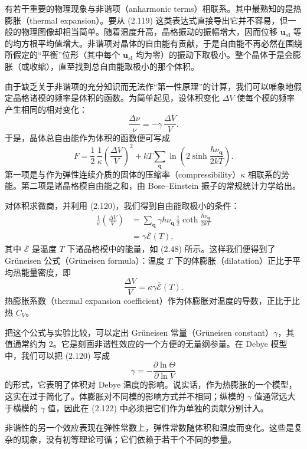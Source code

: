 有若干重要的物理现象与非谐项（anharmonic terms）相联系。其中最熟知的是热膨胀（thermal expansion）。要从 (2.119) 这类表达式直接导出它并不容易，但一般的物理图像却相当简单。随着温度升高，晶格振动的振幅增大，因而位移 $\mathbf{u}_{s\mathbf{l}}$ 等的均方根平均值增大。非谐项对晶体的自由能有贡献，于是自由能不再必然在围绕所假定的“平衡”位形（其中每个 $\mathbf{u}_{s\mathbf{l}}$ 均为零）的振动下取极小。整个晶体于是会膨胀（或收缩），直至找到总自由能取极小的那个体积。

由于缺乏关于非谐项的充分知识而无法作“第一性原理”的计算，我们可以唯象地假定晶格诸模的频率是体积的函数。为简单起见，设体积变化 $\Delta V$ 使每个模的频率产生相同的相对变化：
\begin{equation*}
\frac{\Delta\nu}{\nu}=-\gamma\,\frac{\Delta V}{V}.
\tag{2.120}
\end{equation*}
于是，晶体总自由能作为体积的函数便可写成
\begin{equation*}
F=\frac{1}{2}\,\frac{1}{\kappa}\left(\frac{\Delta V}{V}\right)^{2}+kT\sum_{\mathbf{q}}\ln\left(2\sinh\frac{\hbar\nu_{\mathbf{q}}}{2kT}\right).
\tag{2.121}
\end{equation*}
第一项是与作为弹性连续介质的固体的压缩率（compressibility）$\kappa$ 相联系的势能。第二项是诸晶格模自由能之和，由 Bose–Einstein 振子的常规统计力学给出。

对体积求微商，并利用 (2.120)，我们得到自由能取极小的条件：
\begin{align*}
\frac{1}{\kappa}\left(\frac{\Delta V}{V}\right)&=\sum_{\mathbf{q}}\gamma\hbar\nu_{\mathbf{q}}\,\tfrac{1}{2}\coth\frac{\hbar\nu_{\mathbf{q}}}{2kT}\\
&=\gamma\bar{\mathcal{E}}(T),
\tag{2.122}
\end{align*}
其中 $\bar{\mathcal{E}}$ 是温度 $T$ 下诸晶格模中的能量，如 (2.48) 所示。这样我们便得到了 Grüneisen 公式（Grüneisen formula）：温度 $T$ 下的体膨胀（dilatation）正比于平均热能量密度，即
\begin{equation*}
\frac{\Delta V}{V}=\kappa\gamma\bar{\mathcal{E}}(T).
\tag{2.123}
\end{equation*}
热膨胀系数（thermal expansion coefficient）作为体膨胀对温度的导数，正比于比热 $C_{V}$。

把这个公式与实验比较，可以定出 Grüneisen 常量（Grüneisen constant）$\gamma$，其值通常约为 2。它是刻画非谐性效应的一个方便的无量纲参量。在 Debye 模型中，我们可以把 (2.120) 写成
\begin{equation*}
\gamma=-\frac{\partial\ln\Theta}{\partial\ln V}
\tag{2.124}
\end{equation*}
的形式，它表明了体积对 Debye 温度的影响。说实话，作为热膨胀的一个模型，这实在过于简化了。体膨胀对不同模的影响方式并不相同；纵模的 $\gamma$ 值通常远大于横模的 $\gamma$ 值，因此在 (2.122) 中必须把它们作为单独的贡献分别计入。

非谐性的另一个效应表现在弹性常数上，弹性常数随体积和温度而变化。这些是复杂的现象，没有初等理论可循；它们依赖于若干个不同的参量。
